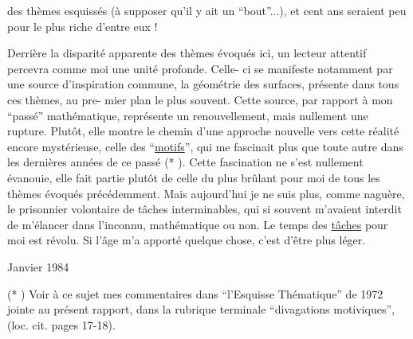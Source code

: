 
des thèmes esquissés (à supposer qu'il y ait un ``bout''...), et
cent ans seraient peu pour le plus riche d'entre eux !

Derrière la disparité apparente des thèmes évoqués ici,
un lecteur attentif percevra comme moi une unité profonde. Celle-%
ci se manifeste notamment par une source d'inspiration commune,
la géométrie des surfaces, présente dans tous ces thèmes, au pre-%
mier plan le plus souvent. Cette source, par rapport à mon ``passé''
mathématique, représente un renouvellement, mais nullement une
rupture. Plutôt, elle montre le chemin d'une approche nouvelle
vers cette réalité encore mystérieuse, celle des ``\uline{motifs}'', qui me
fascinait plus que toute autre dans les dernières années de ce
passé (* ). Cette fascination ne s'est nullement évanouie,
elle fait partie plutôt de celle du plus brûlant pour moi de tous
les thèmes évoqués précédemment. Mais aujourd'hui je ne suis plus,
comme naguère, le prisonnier volontaire de tâches interminables,
qui si souvent m'avaient interdit de m'élancer dans l'inconnu,
mathématique ou non. Le temps des \uline{tâches} pour moi est révolu. Si
l'âge m'a apporté quelque chose, c'est d'être plus léger.

Janvier 1984

(* ) Voir à ce sujet mes commentaires dans ``l'Esquisse Thématique''
de 1972 jointe au présent rapport, dans la rubrique terminale
``divagations motiviques'', (loc. cit. pages 17-18).

